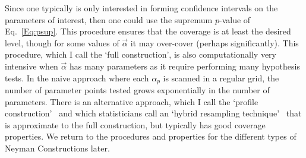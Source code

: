 Since one typically is only interested in forming confidence intervals on the parameters of interest, then one could use the supremum $p$-value of Eq.~\ref{Eq:psup}.  This procedure ensures that the coverage is at least the desired level, though for some values of $\vec\alpha$ it may over-cover (perhaps significantly).  This procedure, which I call the `full construction',  is also computationally very intensive when $\vec\alpha$ has many parameters as it require performing many hypothesis tests.  In the naive approach where each $\alpha_p$ is scanned in a regular grid, the number of parameter points tested grows exponentially in the number of parameters.  There is an alternative approach, which I call the `profile construction'~\cite{Feldman,Cranmer:2005hi}
and which statisticians call an `hybrid resampling technique'~ \cite{Hybrid,Bodhi} that is approximate to the full construction, but typically has good coverage properties.  We return to the procedures and properties for the different types of Neyman Constructions later.
